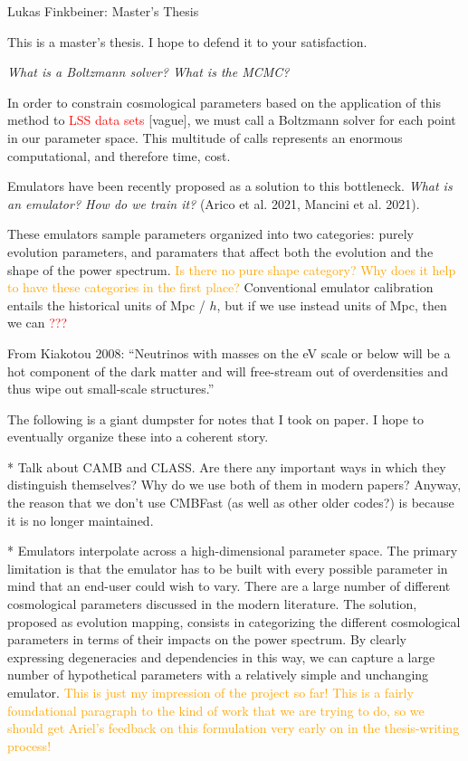 \documentclass[11pt]{article}
\begin{document}
\fontsize{12}{15}

\begin{center}
Lukas Finkbeiner: Master's Thesis
\end{center}

This is a master's thesis. I hope to defend it to your satisfaction.

\textit{What is a Boltzmann solver? What is the MCMC?}

In order to constrain cosmological parameters based on the application of this
method to \textcolor{red}{LSS data sets} [vague], we must call a Boltzmann
solver for each point in our parameter space. This multitude of calls
represents an enormous computational, and therefore time, cost.

Emulators have been recently proposed as a solution to this bottleneck.
\textit{What is an emulator? How do we train it?} (Arico et al. 2021, Mancini
et al. 2021).

These emulators sample parameters organized into two categories: purely
evolution parameters, and paramaters that affect both the evolution and the
shape of the power spectrum. \textcolor{orange}{Is there no pure shape
category? Why does it help to have these categories in the first place?}
Conventional emulator calibration entails the historical units of Mpc / $h$,
but if we use instead units of Mpc, then we can \textcolor{red}{???} 

From Kiakotou 2008: ``Neutrinos with masses on the eV scale or below will be a
hot component of the dark matter and will free-stream out of overdensities and
thus wipe out small-scale structures.''

The following is a giant dumpster for notes that I took on paper. I hope to
eventually organize these into a coherent story.

* Talk about CAMB and CLASS. Are there any important ways in which they
distinguish themselves? Why do we use both of them in modern papers? Anyway,
the reason that we don't use CMBFast (as well as other older codes?) is
because it is no longer maintained.

* Emulators interpolate across a high-dimensional parameter space. The primary
limitation is that the emulator has to be built with every possible parameter
in mind that an end-user could wish to vary. There are a large number of
different cosmological parameters discussed in the modern literature. The
solution, proposed as evolution mapping, consists in categorizing the
different cosmological parameters in terms of their impacts on the power
spectrum. By clearly expressing degeneracies and dependencies in this way, we
can capture a large number of hypothetical parameters with a relatively simple
and unchanging emulator. \textcolor{orange}{This is just my impression of the
project so far! This is a fairly foundational paragraph to the kind of work
that we are trying to do, so we should get Ariel's feedback on this
formulation very early on in the thesis-writing process!}

\end{document}
